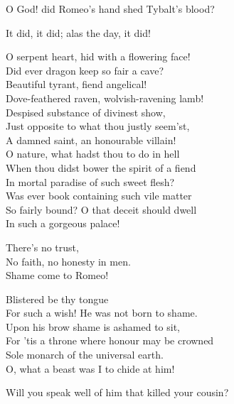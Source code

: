 \documentclass[10pt,a4paper]{article}
\begin{document}
\begin{drama*}
\julspeaks
O God! did Romeo's hand shed Tybalt's blood?

\nursespeaks
It did, it did; alas the day, it did!

\julspeaks
O serpent heart, hid with a flowering face!\\
Did ever dragon keep so fair a cave?\\
Beautiful tyrant, fiend angelical!\\
Dove-feathered raven, wolvish-ravening lamb!\\
Despised substance of divinest show,\\
Just opposite to what thou justly seem'st,\\
A damned saint, an honourable villain!\\
O nature, what hadst thou to do in hell\\
When thou didst bower the spirit of a fiend\\
In mortal paradise of such sweet flesh?\\
Was ever book containing such vile matter\\
So fairly bound? O that deceit should dwell\\
In such a gorgeous palace!

\nursespeaks
There's no trust,\\
No faith, no honesty in men.\\
Shame come to Romeo!

\julspeaks
Blistered be thy tongue\\
For such a wish! He was not born to shame.\\
Upon his brow shame is ashamed to sit,\\
For 'tis a throne where honour may be crowned\\
Sole monarch of the universal earth.\\
O, what a beast was I to chide at him!

\nursespeaks
Will you speak well of him that killed your cousin?


\end{drama*}
\end{document}
